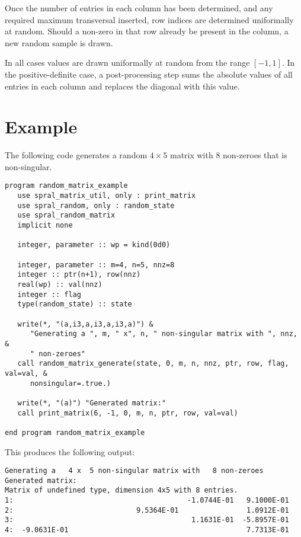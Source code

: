 Once the number of entries in each column has been determined, and any required
maximum transversal inserted, row indices are determined uniformally at random.
Should a non-zero in that row already be present in the column, a new random
sample is drawn.

In all cases values are drawn uniformally at random from the range $[-1,1]$. In
the positive-definite case, a post-processing step sums the absolute values of
all entries in each column and replaces the diagonal with this value.


\section{Example} \label{examples}

The following code generates a random $4 \times 5$ matrix with $8$ non-zeroes
that is non-singular.
\begin{verbatim}
program random_matrix_example
   use spral_matrix_util, only : print_matrix
   use spral_random, only : random_state
   use spral_random_matrix
   implicit none

   integer, parameter :: wp = kind(0d0)

   integer, parameter :: m=4, n=5, nnz=8
   integer :: ptr(n+1), row(nnz)
   real(wp) :: val(nnz)
   integer :: flag
   type(random_state) :: state

   write(*, "(a,i3,a,i3,a,i3,a)") &
      "Generating a ", m, " x", n, " non-singular matrix with ", nnz, &
      " non-zeroes"
   call random_matrix_generate(state, 0, m, n, nnz, ptr, row, flag, val=val, &
      nonsingular=.true.)

   write(*, "(a)") "Generated matrix:"
   call print_matrix(6, -1, 0, m, n, ptr, row, val=val)

end program random_matrix_example
\end{verbatim}

This produces the following output:
\begin{verbatim}
Generating a   4 x  5 non-singular matrix with   8 non-zeroes
Generated matrix:
Matrix of undefined type, dimension 4x5 with 8 entries.
1:                                         -1.0744E-01   9.1000E-01
2:                             9.5364E-01                1.0912E-01
3:                                          1.1631E-01  -5.8957E-01
4:  -9.0631E-01                                          7.7313E-01
\end{verbatim}

\begin{funders}
\end{funders}
